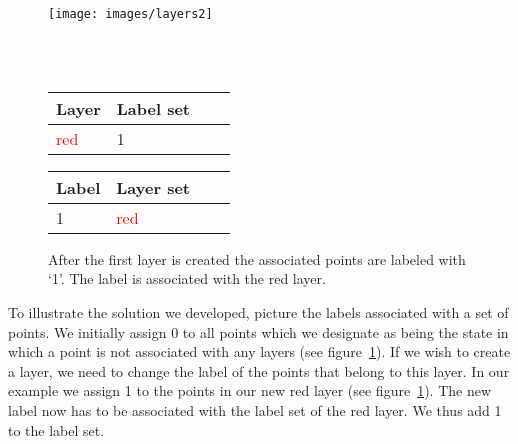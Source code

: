 \begin{figure}[ht]
	\begin{minipage}[b]{\linewidth}
		\centering
		\texttt{[image: images/layers2]}
	\end{minipage}
	\\\\
	\begin{minipage}[b]{0.49\linewidth}
		\hfill
		\begin{tabular}[b]{|l|l|l|l|}
			\hline
			Layer & Label set \\
			\hline
			\textcolor{red}{red}       & 1 \\
			\hline
		\end{tabular}
	\end{minipage}
	\hspace{0.5cm}
	\begin{minipage}[b]{0.5\linewidth}
		\begin{tabular}[b]{|l|l|l|l|}
			\hline
			Label & Layer set \\
			\hline
			1       & \textcolor{red}{red} \\
			\hline
		\end{tabular}
		\hfill
	\end{minipage}
	\caption[Label state after creation of the first layer.]{ After the first layer is created the associated points are labeled with `1'. The label is associated with the red layer. \label{fig:3-layer2}}
\end{figure}

To illustrate the solution we developed, picture the labels associated with a set of points. We initially assign 0 to all points which we designate as being the state in which a point is not associated with any layers (see figure~\ref{fig:3-layer2}). If we wish to create a layer, we need to change the label of the points that belong to this layer. In our example we assign 1 to the points in our new red layer (see figure~\ref{fig:3-layer2}). The new label now has to be associated with the label set of the red layer. We thus add 1 to the label set.


